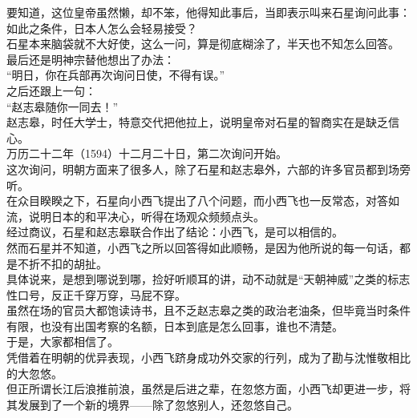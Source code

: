 \begin{multicols}{\theparacolNo}
要知道，这位皇帝虽然懒，却不笨，他得知此事后，当即表示叫来石星询问此事：如此之条件，日本人怎么会轻易接受？\\

石星本来脑袋就不大好使，这么一问，算是彻底糊涂了，半天也不知怎么回答。\\

最后还是明神宗替他想出了办法：\\

“明日，你在兵部再次询问日使，不得有误。”\\

之后还跟上一句：\\

“赵志皋随你一同去！”\\

赵志皋，时任大学士，特意交代把他拉上，说明皇帝对石星的智商实在是缺乏信心。\\

万历二十二年（1594）十二月二十日，第二次询问开始。\\

这次询问，明朝方面来了很多人，除了石星和赵志皋外，六部的许多官员都到场旁听。\\

在众目睽睽之下，石星向小西飞提出了八个问题，而小西飞也一反常态，对答如流，说明日本的和平决心，听得在场观众频频点头。\\

经过商议，石星和赵志皋联合作出了结论：小西飞，是可以相信的。\\

然而石星并不知道，小西飞之所以回答得如此顺畅，是因为他所说的每一句话，都是不折不扣的胡扯。\\

具体说来，是想到哪说到哪，捡好听顺耳的讲，动不动就是“天朝神威”之类的标志性口号，反正千穿万穿，马屁不穿。\\

虽然在场的官员大都饱读诗书，且不乏赵志皋之类的政治老油条，但毕竟当时条件有限，也没有出国考察的名额，日本到底是怎么回事，谁也不清楚。\\

于是，大家都相信了。\\

凭借着在明朝的优异表现，小西飞跻身成功外交家的行列，成为了勘与沈惟敬相比的大忽悠。\\

但正所谓长江后浪推前浪，虽然是后进之辈，在忽悠方面，小西飞却更进一步，将其发展到了一个新的境界——除了忽悠别人，还忽悠自己。\\


\end{multicols}
